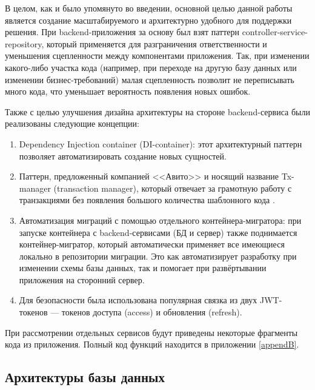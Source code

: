 \documentclass[diploma]{SCWorks}
\begin{document}
В целом, как и было упомянуто во введении, основной целью данной работы 
является создание 
масштабируемого и архитектурно удобного для поддержки решения. При 
backend-приложения за основу был взят паттерн controller-service-repository,
который применяется для разграничения ответственности и уменьшения сцепленности
между компонентами приложения. Так, при изменении какого-либо участка кода 
(например, при переходе на другую базу данных или изменении бизнес-требований) 
малая сцепленность позволит не переписывать много кода, что уменьшает 
вероятность появления новых ошибок.

Также с целью улучшения дизайна архитектуры на стороне backend-сервиса были 
реализованы следующие концепции:
\begin{enumerate}
    \item Dependency Injection container (DI-container): этот архитектурный 
    паттерн позволяет автоматизировать создание новых сущностей.
    \item Паттерн, предложенный компанией <<Авито>> и носящий название 
    Tx-manager (transaction manager), который отвечает за грамотную работу с транзакциями без 
    появления большого количества шаблонного кода \cite{txmanager}.
    \item Автоматизация миграций с помощью отдельного контейнера-мигратора:
    при запуске контейнера с backend-сервисами (БД и сервер) также поднимается
    контейнер-мигратор, который автоматически применяет все имеющиеся локально
    в репозитории миграции. Это как автоматизирует разработку при изменении 
    схемы базы данных, так и помогает при развёртывании приложения на сторонний 
    сервер.
    \item Для безопасности была использована популярная связка из двух 
    JWT-токенов — токенов доступа (access) и обновления (refresh).
\end{enumerate}

При рассмотрении отдельных сервисов будут приведены некоторые фрагменты кода
из приложения. Полный код функций находится в приложении \ref{appendB}.

\subsection{Архитектуры базы данных}
\end{document}
